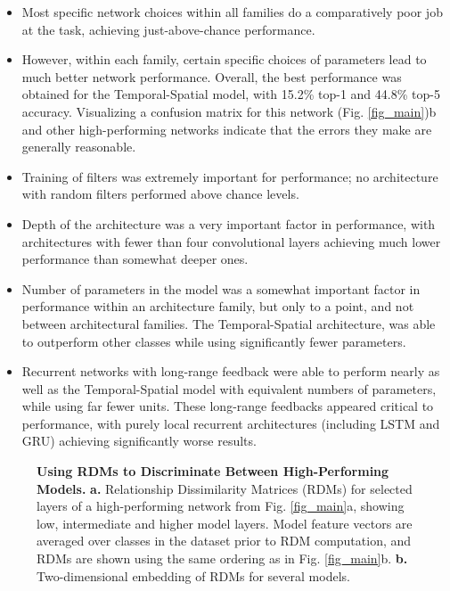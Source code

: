 \begin{itemize}[leftmargin=*,itemsep=0ex,topsep=1ex]
   \item Most specific network choices within all families do a comparatively poor job at the task, achieving just-above-chance performance. 
   \item However, within each family, certain specific choices of parameters lead to much better network performance. 
   Overall, the best performance was obtained for the Temporal-Spatial model, with 15.2\% top-1 and 44.8\% top-5 accuracy.  
   Visualizing a confusion matrix for this network (Fig. \ref{fig_main})b  and other high-performing networks indicate that the errors they make are generally reasonable. 
   \item Training of filters was extremely important for performance; no architecture with random filters performed above chance levels.
   \item Depth of the architecture was a very important factor in performance, with architectures with fewer than four convolutional layers achieving much lower performance than somewhat deeper ones.
   \item Number of parameters in the model was a somewhat important factor in performance within an architecture family, but only to a point, and not between architectural families.    
   The Temporal-Spatial architecture, was able to outperform other classes while using significantly fewer parameters. 
   \item Recurrent networks with long-range feedback were able to perform nearly as well as the Temporal-Spatial model with equivalent numbers of parameters, while using far fewer units.   
   These long-range feedbacks appeared critical to performance, with purely local recurrent architectures (including LSTM and GRU) achieving significantly worse results.
\end{itemize}
 

\begin{figure}
\vspace{-2mm}
\caption{\textbf{Using RDMs to Discriminate Between High-Performing Models.} \textbf{a.} Relationship Dissimilarity Matrices (RDMs) for selected layers of a high-performing network from Fig. \ref{fig_main}a, showing low, intermediate and higher model layers.  Model feature vectors are averaged over classes in the dataset prior to RDM computation, and RDMs are shown using the same ordering as in Fig. \ref{fig_main}b. \textbf{b.} Two-dimensional embedding of RDMs for several models.   ~\label{fig_rdms}}
\end{figure}

